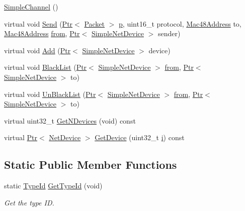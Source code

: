 \begin{DoxyCompactItemize}
\item 
\hyperlink{classns3_1_1SimpleChannel_adc7dbbf3d8715252fad1504da0846982}{Simple\+Channel} ()
\item 
virtual void \hyperlink{classns3_1_1SimpleChannel_af454a78269793a4473f2cf69e0bc5676}{Send} (\hyperlink{classns3_1_1Ptr}{Ptr}$<$ \hyperlink{classns3_1_1Packet}{Packet} $>$ \hyperlink{lte__link__budget__x2__handover__measures_8m_ac9de518908a968428863f829398a4e62}{p}, uint16\+\_\+t protocol, \hyperlink{classns3_1_1Mac48Address}{Mac48\+Address} to, \hyperlink{classns3_1_1Mac48Address}{Mac48\+Address} \hyperlink{lte__amc_8m_a1b4c81ff74eb1a626b5ade44c81004b3}{from}, \hyperlink{classns3_1_1Ptr}{Ptr}$<$ \hyperlink{classns3_1_1SimpleNetDevice}{Simple\+Net\+Device} $>$ sender)
\item 
virtual void \hyperlink{classns3_1_1SimpleChannel_abb8b963e9ddf2521a3b634015a2b7c24}{Add} (\hyperlink{classns3_1_1Ptr}{Ptr}$<$ \hyperlink{classns3_1_1SimpleNetDevice}{Simple\+Net\+Device} $>$ device)
\item 
virtual void \hyperlink{classns3_1_1SimpleChannel_a0189460ab5b5da8ef3e9d5f97674a046}{Black\+List} (\hyperlink{classns3_1_1Ptr}{Ptr}$<$ \hyperlink{classns3_1_1SimpleNetDevice}{Simple\+Net\+Device} $>$ \hyperlink{lte__amc_8m_a1b4c81ff74eb1a626b5ade44c81004b3}{from}, \hyperlink{classns3_1_1Ptr}{Ptr}$<$ \hyperlink{classns3_1_1SimpleNetDevice}{Simple\+Net\+Device} $>$ to)
\item 
virtual void \hyperlink{classns3_1_1SimpleChannel_adffb0740c760a53793702bf9b2fdbd4b}{Un\+Black\+List} (\hyperlink{classns3_1_1Ptr}{Ptr}$<$ \hyperlink{classns3_1_1SimpleNetDevice}{Simple\+Net\+Device} $>$ \hyperlink{lte__amc_8m_a1b4c81ff74eb1a626b5ade44c81004b3}{from}, \hyperlink{classns3_1_1Ptr}{Ptr}$<$ \hyperlink{classns3_1_1SimpleNetDevice}{Simple\+Net\+Device} $>$ to)
\item 
virtual uint32\+\_\+t \hyperlink{classns3_1_1SimpleChannel_a28b2eade4ccae74d9a5db1e6b7fa5618}{Get\+N\+Devices} (void) const 
\item 
virtual \hyperlink{classns3_1_1Ptr}{Ptr}$<$ \hyperlink{classns3_1_1NetDevice}{Net\+Device} $>$ \hyperlink{classns3_1_1SimpleChannel_a05ecfd9b7022e869c22a7301f8e571d6}{Get\+Device} (uint32\+\_\+t \hyperlink{lte__uplink__power__control_8m_a6f6ccfcf58b31cb6412107d9d5281426}{i}) const 
\end{DoxyCompactItemize}
\subsection*{Static Public Member Functions}
\begin{DoxyCompactItemize}
\item 
static \hyperlink{classns3_1_1TypeId}{Type\+Id} \hyperlink{classns3_1_1SimpleChannel_a7af91a9b52c05224d7d0eceb637bb4df}{Get\+Type\+Id} (void)
\begin{DoxyCompactList}\small\item\em Get the type ID. \end{DoxyCompactList}\end{DoxyCompactItemize}
